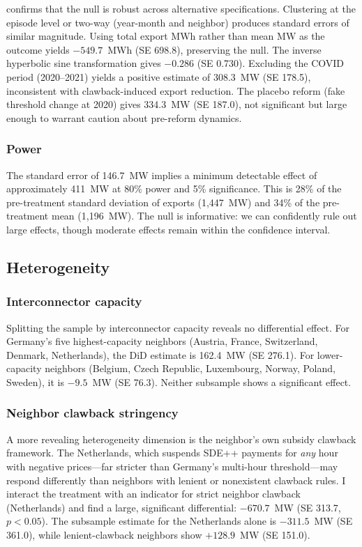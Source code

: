 \documentclass[12pt]{article}
\begin{document}


 confirms that the null is robust across alternative specifications. Clustering at the episode level or two-way (year-month and neighbor) produces standard errors of similar magnitude. Using total export MWh rather than mean MW as the outcome yields $-549.7$~MWh (SE 698.8), preserving the null. The inverse hyperbolic sine transformation gives $-0.286$ (SE 0.730). Excluding the COVID period (2020--2021) yields a positive estimate of 308.3~MW (SE 178.5), inconsistent with clawback-induced export reduction. The placebo reform (fake threshold change at 2020) gives 334.3~MW (SE 187.0), not significant but large enough to warrant caution about pre-reform dynamics.

\subsubsection*{Power}
The standard error of 146.7~MW implies a minimum detectable effect of approximately 411~MW at 80\% power and 5\% significance. This is 28\% of the pre-treatment standard deviation of exports (1,447~MW) and 34\% of the pre-treatment mean (1,196~MW). The null is informative: we can confidently rule out large effects, though moderate effects remain within the confidence interval.

\subsection{Heterogeneity}

\subsubsection*{Interconnector capacity}
Splitting the sample by interconnector capacity reveals no differential effect. For Germany's five highest-capacity neighbors (Austria, France, Switzerland, Denmark, Netherlands), the DiD estimate is 162.4~MW (SE 276.1). For lower-capacity neighbors (Belgium, Czech Republic, Luxembourg, Norway, Poland, Sweden), it is $-9.5$~MW (SE 76.3). Neither subsample shows a significant effect.

\subsubsection*{Neighbor clawback stringency}
A more revealing heterogeneity dimension is the neighbor's own subsidy clawback framework. The Netherlands, which suspends SDE++ payments for \textit{any} hour with negative prices---far stricter than Germany's multi-hour threshold---may respond differently than neighbors with lenient or nonexistent clawback rules. I interact the treatment with an indicator for strict neighbor clawback (Netherlands) and find a large, significant differential: $-670.7$~MW (SE 313.7, $p < 0.05$). The subsample estimate for the Netherlands alone is $-311.5$~MW (SE 361.0), while lenient-clawback neighbors show $+128.9$~MW (SE 151.0).
\end{document}
